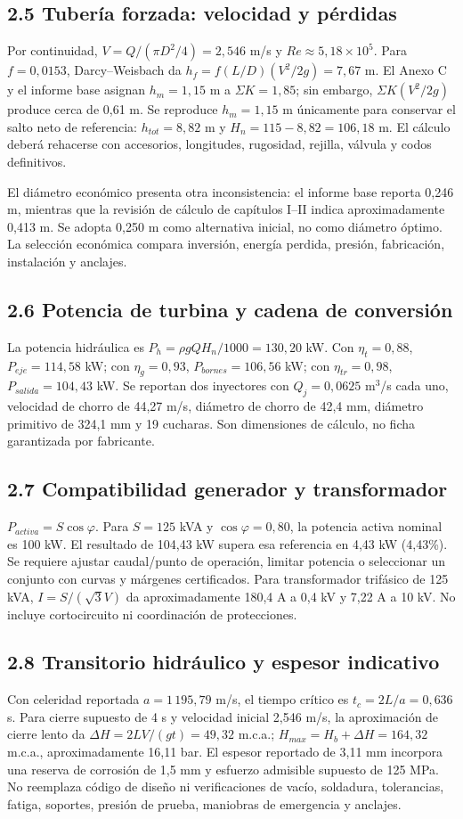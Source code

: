 \documentclass[11pt,a4paper]{article}
\begin{document}
\subsection*{2.5 Tubería forzada: velocidad y pérdidas}
Por continuidad, $V=Q/(\pi D^2/4)=2,546$ m/s y $Re\approx5,18\times10^5$. Para $f=0,0153$, Darcy--Weisbach da $h_f=f(L/D)(V^2/2g)=7,67$ m. El Anexo C y el informe base asignan $h_m=1,15$ m a $\Sigma K=1,85$; sin embargo, $\Sigma K(V^2/2g)$ produce cerca de 0,61 m. Se reproduce $h_m=1,15$ m únicamente para conservar el salto neto de referencia: $h_{tot}=8,82$ m y $H_n=115-8,82=106,18$ m. El cálculo deberá rehacerse con accesorios, longitudes, rugosidad, rejilla, válvula y codos definitivos.

El diámetro económico presenta otra inconsistencia: el informe base reporta 0,246 m, mientras que la revisión de cálculo de capítulos I--II indica aproximadamente 0,413 m. Se adopta 0,250 m como alternativa inicial, no como diámetro óptimo. La selección económica compara inversión, energía perdida, presión, fabricación, instalación y anclajes.

\subsection*{2.6 Potencia de turbina y cadena de conversión}
La potencia hidráulica es $P_h=\rho gQH_n/1000=130,20$ kW. Con $\eta_t=0,88$, $P_{eje}=114,58$ kW; con $\eta_g=0,93$, $P_{bornes}=106,56$ kW; con $\eta_{tr}=0,98$, $P_{salida}=104,43$ kW. Se reportan dos inyectores con $Q_j=0,0625$ m$^3$/s cada uno, velocidad de chorro de 44,27 m/s, diámetro de chorro de 42,4 mm, diámetro primitivo de 324,1 mm y 19 cucharas. Son dimensiones de cálculo, no ficha garantizada por fabricante.

\subsection*{2.7 Compatibilidad generador y transformador}
$P_{activa}=S\cos\varphi$. Para $S=125$ kVA y $\cos\varphi=0,80$, la potencia activa nominal es 100 kW. El resultado de 104,43 kW supera esa referencia en 4,43 kW (4,43\%). Se requiere ajustar caudal/punto de operación, limitar potencia o seleccionar un conjunto con curvas y márgenes certificados. Para transformador trifásico de 125 kVA, $I=S/(\sqrt3V)$ da aproximadamente 180,4 A a 0,4 kV y 7,22 A a 10 kV. No incluye cortocircuito ni coordinación de protecciones.

\subsection*{2.8 Transitorio hidráulico y espesor indicativo}
Con celeridad reportada $a=1\,195,79$ m/s, el tiempo crítico es $t_c=2L/a=0,636$ s. Para cierre supuesto de 4 s y velocidad inicial 2,546 m/s, la aproximación de cierre lento da $\Delta H=2LV/(gt)=49,32$ m.c.a.; $H_{max}=H_b+\Delta H=164,32$ m.c.a., aproximadamente 16,11 bar. El espesor reportado de 3,11 mm incorpora una reserva de corrosión de 1,5 mm y esfuerzo admisible supuesto de 125 MPa. No reemplaza código de diseño ni verificaciones de vacío, soldadura, tolerancias, fatiga, soportes, presión de prueba, maniobras de emergencia y anclajes.
\end{document}
